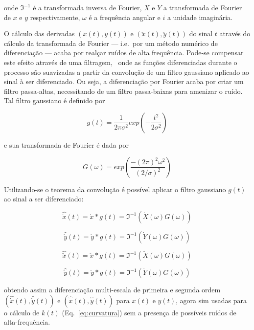 \noindent onde $\Im^{-1}$ é a transformada inversa de Fourier, $X$ e $Y$ a
transformada de Fourier de $x$ e $y$ respectivamente, $\omega$ é a frequência angular
e $i$ a unidade imaginária.

O cálculo das derivadas $(\dot{x}(t), \dot{y}(t))$ e $(\ddot{x}(t),
\ddot{y}(t))$ do sinal $t$ através do cálculo da transformada de
Fourier --- i.e.\ por um método numérico de diferenciação --- acaba
por realçar ruídos de alta frequência. Pode-se compensar este efeito
através de uma filtragem,~\cite{luciano,luciano2010} onde as funções
diferenciadas durante o processo são suavizadas a partir da convolução
de um filtro gaussiano aplicado ao sinal à ser diferenciado. Ou seja,
a diferenciação por Fourier acaba por criar um filtro passa-altas,
necessitando de um filtro passa-baixas para amenizar o ruído. Tal
filtro gaussiano é definido por

\begin{equation}
g(t) = \frac{1}{2\pi\sigma^2} exp \left( -\frac{t^2}{2\sigma^2}\right)
\end{equation}

\noindent e sua transformada de Fourier é dada por

\begin{equation}
G(\omega) = exp \left( \frac{-(2\pi)^2\omega^2}{(2/\sigma)^2} \right)
\end{equation}

Utilizando-se o teorema da convolução é possível aplicar o filtro
gaussiano $g(t)$ ao sinal a ser diferenciado:

\begin{equation}
\hat{\dot{x}}(t) = \dot{x} \ast g(t) = \Im^{-1}\left( \dot{X}(\omega) G(\omega) \right)
\end{equation}

\begin{equation}
\hat{\dot{y}}(t) = \dot{y} \ast g(t) = \Im^{-1}\left( \dot{Y}(\omega) G(\omega) \right)
\end{equation}

\begin{equation}
\hat{\ddot{x}}(t) = \ddot{x} \ast g(t) = \Im^{-1}\left( \ddot{X}(\omega) G(\omega) \right)
\end{equation}

\begin{equation}
\hat{\ddot{y}}(t) = \ddot{y} \ast g(t) = \Im^{-1}\left( \ddot{Y}(\omega) G(\omega) \right)
\end{equation}

\noindent obtendo assim a diferenciação multi-escala de primeira e
segunda ordem $(\hat{\dot{x}}(t),\hat{\dot{y}}(t))$ e
$(\hat{\ddot{x}}(t),\hat{\ddot{y}}(t))$ para $x(t)$ e $y(t)$, agora
sim usadas para o cálculo de $k(t)$ (Eq.~\ref{eq:curvatura}) sem a
presença de possíveis ruídos de alta-frequência.

